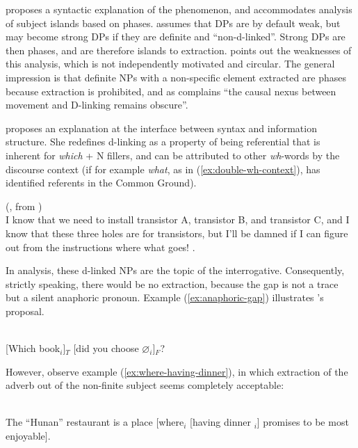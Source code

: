 \citet{Jimenez-Fernandez.2009} proposes a syntactic explanation of the phenomenon, and accommodates  analysis of subject islands based on phases. \citet{Jimenez-Fernandez.2009} assumes that DPs are by default weak, but may become strong DPs if they are definite and ``non-d-linked''. Strong DPs are then phases, and are therefore islands to extraction.
\citet[313]{Chaves.2013} points out the weaknesses of this analysis, which is not independently motivated and circular. The general impression is that definite NPs with a non-specific element extracted are phases because extraction is prohibited, and as \citeauthor{Chaves.2013} complains ``the causal nexus between movement and D-linking remains obscure''.

\citet{Erteschik-Shir.2006} proposes an explanation at the interface between syntax and information structure. She redefines d-linking as a property of being referential that is inherent for \emph{which} + N fillers, and can be attributed to other \textit{wh}-words by the discourse context (if for example \emph{what}, as in (\ref{ex:double-wh-context}), has identified referents in the Common Ground). 

\ea (\citealt{Pesetsky.1987}, from \citealt{Bolinger.1979})\\
I know that we need to install transistor A, transistor B, and
transistor C, and I know that these three holes are for transistors,
but I'll be damned if I can figure out from the instructions where
what goes! .
\label{ex:double-wh-context}
\z 

In  analysis, these d-linked NPs are the topic of the interrogative. Consequently, strictly speaking, there would be no extraction, because the gap is not a trace but a silent anaphoric pronoun. Example (\ref{ex:anaphoric-gap}) illustrates \citeauthor{Erteschik-Shir.2006}'s proposal.

\ea \citep[327]{Erteschik-Shir.2006}\\
{} [Which book$_i$]$_T$ [did you choose $\varnothing{}_i$]$_F$?
\label{ex:anaphoric-gap}
\z 

However, observe example (\ref{ex:where-having-dinner}), in which extraction of the adverb out of the non-finite subject seems completely acceptable:

\ea \citep[72]{Grosu.1981}\\
The “Hunan” restaurant is a place [where$_i$ [having dinner \trace{}$_i$] promises to be most enjoyable].
\label{ex:where-having-dinner}
\z 

